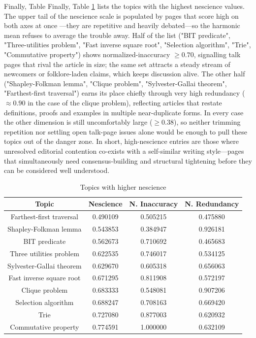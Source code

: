 Finally, Table Finally, Table \ref{tab:Higher-nescience-of-topics} lists the topics with the highest nescience values. The upper tail of the nescience scale is populated by pages that score high on both axes at once —they are repetitive and heavily debated—so the harmonic mean refuses to average the trouble away.  Half of the list ("BIT predicate", "Three-utilities problem", "Fast inverse square root", "Selection algorithm", "Trie", "Commutative property") shows normalized-inaccuracy $\geq 0.70$, signalling talk pages that rival the article in size; the same set attracts a steady stream of newcomers or folklore-laden claims, which keeps discussion alive.  The other half ("Shapley-Folkman lemma", "Clique problem", "Sylvester-Gallai theorem", "Farthest-first traversal") earns its place chiefly through very high redundancy ($\approx 0.90$ in the case of the clique problem), reflecting articles that restate definitions, proofs and examples in multiple near-duplicate forms.  In every case the other dimension is still uncomfortably large ($\geq 0.38$), so neither trimming repetition nor settling open talk-page issues alone would be enough to pull these topics out of the danger zone.  In short, high-nescience entries are those where unresolved editorial contention co-exists with a self-similar writing style—pages that simultaneously need consensus-building and structural tightening before they can be considered well understood.

\begin{table}
\begin{centering}
\begin{tabular}{|c|c|c|c|}
\hline 
Topic & Nescience & N. Inaccuracy & N. Redundancy \tabularnewline
\hline 
\hline
Farthest-first traversal & 0.490109 & 0.505215 & 0.475880 \tabularnewline
\hline
Shapley-Folkman lemma & 0.543853 & 0.384947 & 0.926181 \tabularnewline
\hline
BIT predicate & 0.562673 & 0.710692 & 0.465683 \tabularnewline
\hline
Three utilities problem & 0.622535 & 0.746017 & 0.534125 \tabularnewline
\hline
Sylvester-Gallai theorem & 0.629670 & 0.605318 & 0.656063 \tabularnewline
\hline
Fast inverse square root & 0.671295 & 0.811908 & 0.572197 \tabularnewline
\hline
Clique problem & 0.683333 & 0.548081 & 0.907206 \tabularnewline
\hline
Selection algorithm & 0.688247 & 0.708163 & 0.669420 \tabularnewline
\hline
Trie & 0.727080 & 0.877003 & 0.620932 \tabularnewline
\hline
Commutative property & 0.774591 & 1.000000 & 0.632109 \tabularnewline
\hline 
\end{tabular}
\par\end{centering}
\caption{\label{tab:Higher-nescience-of-topics}Topics with higher nescience}
\end{table}

